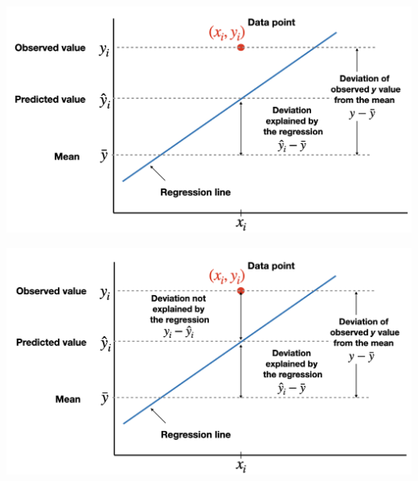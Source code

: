 \documentclass[
]{article}
\begin{document}
\begin{center}\includegraphics[width=0.6\linewidth,height=0.6\textheight]{figures/cod4} \end{center}

\begin{center}\includegraphics[width=0.6\linewidth,height=0.6\textheight]{figures/cod5} \end{center}
\end{document}
